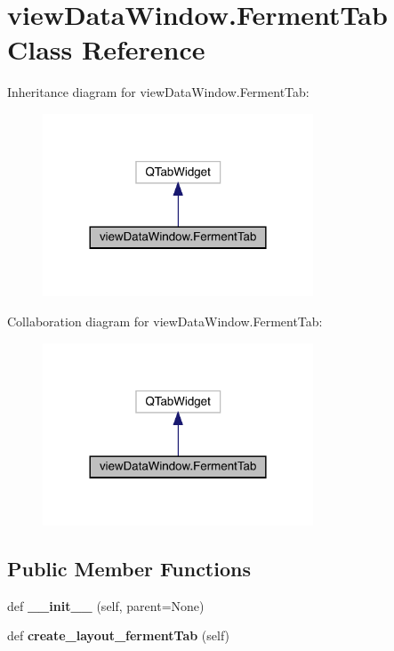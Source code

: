 \hypertarget{classview_data_window_1_1_ferment_tab}{}\section{view\+Data\+Window.\+Ferment\+Tab Class Reference}
\label{classview_data_window_1_1_ferment_tab}


Inheritance diagram for view\+Data\+Window.\+Ferment\+Tab\+:\nopagebreak
\begin{figure}[H]
\begin{center}
\leavevmode
\includegraphics[width=228pt]{classview_data_window_1_1_ferment_tab__inherit__graph}
\end{center}
\end{figure}


Collaboration diagram for view\+Data\+Window.\+Ferment\+Tab\+:\nopagebreak
\begin{figure}[H]
\begin{center}
\leavevmode
\includegraphics[width=228pt]{classview_data_window_1_1_ferment_tab__coll__graph}
\end{center}
\end{figure}
\subsection*{Public Member Functions}
\begin{DoxyCompactItemize}
\item 
\mbox{\label{classview_data_window_1_1_ferment_tab_a9b9d9f1ed9879d7d6e5d0db9fd80dc46}} 
def {\bfseries \+\_\+\+\_\+init\+\_\+\+\_\+} (self, parent=None)
\item 
\mbox{\label{classview_data_window_1_1_ferment_tab_a6443f6fe3c7ba5264f9a60d9463de6ff}} 
def {\bfseries create\+\_\+layout\+\_\+ferment\+Tab} (self)
\end{DoxyCompactItemize}
